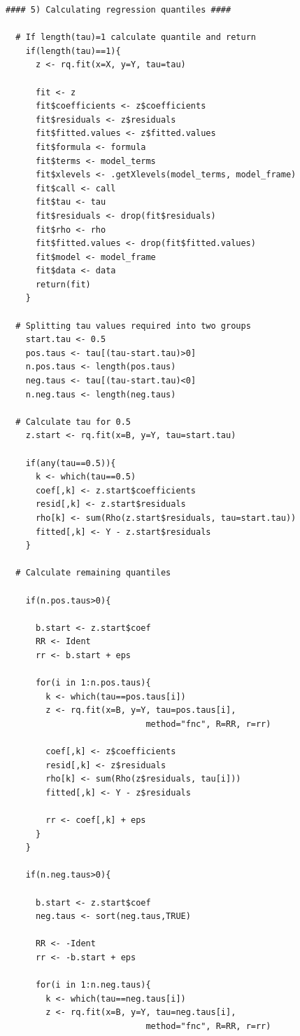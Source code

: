 \documentclass[12pt,a4paper]{report}
\begin{document}
\begin{lstlisting}
#### 5) Calculating regression quantiles ####

  # If length(tau)=1 calculate quantile and return
    if(length(tau)==1){
      z <- rq.fit(x=X, y=Y, tau=tau)

      fit <- z
      fit$coefficients <- z$coefficients
      fit$residuals <- z$residuals
      fit$fitted.values <- z$fitted.values
      fit$formula <- formula
      fit$terms <- model_terms
      fit$xlevels <- .getXlevels(model_terms, model_frame)
      fit$call <- call
      fit$tau <- tau
      fit$residuals <- drop(fit$residuals)
      fit$rho <- rho
      fit$fitted.values <- drop(fit$fitted.values)
      fit$model <- model_frame
      fit$data <- data
      return(fit)
    }

  # Splitting tau values required into two groups
    start.tau <- 0.5
    pos.taus <- tau[(tau-start.tau)>0]
    n.pos.taus <- length(pos.taus)
    neg.taus <- tau[(tau-start.tau)<0]
    n.neg.taus <- length(neg.taus)

  # Calculate tau for 0.5
    z.start <- rq.fit(x=B, y=Y, tau=start.tau)

    if(any(tau==0.5)){
      k <- which(tau==0.5)
      coef[,k] <- z.start$coefficients
      resid[,k] <- z.start$residuals
      rho[k] <- sum(Rho(z.start$residuals, tau=start.tau))
      fitted[,k] <- Y - z.start$residuals
    }

  # Calculate remaining quantiles

    if(n.pos.taus>0){

      b.start <- z.start$coef
      RR <- Ident
      rr <- b.start + eps

      for(i in 1:n.pos.taus){
        k <- which(tau==pos.taus[i])
        z <- rq.fit(x=B, y=Y, tau=pos.taus[i],
                            method="fnc", R=RR, r=rr)

        coef[,k] <- z$coefficients
        resid[,k] <- z$residuals
        rho[k] <- sum(Rho(z$residuals, tau[i]))
        fitted[,k] <- Y - z$residuals

        rr <- coef[,k] + eps
      }
    }

    if(n.neg.taus>0){

      b.start <- z.start$coef
      neg.taus <- sort(neg.taus,TRUE)

      RR <- -Ident
      rr <- -b.start + eps

      for(i in 1:n.neg.taus){
        k <- which(tau==neg.taus[i])
        z <- rq.fit(x=B, y=Y, tau=neg.taus[i],
                            method="fnc", R=RR, r=rr)


\end{lstlisting}
\end{document}
